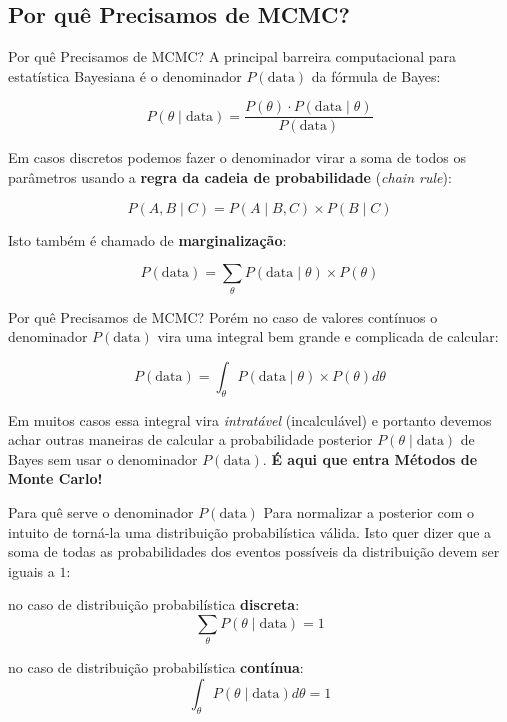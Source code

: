 \subsection{Por quê Precisamos de MCMC?}
\begin{frame}{Por quê Precisamos de MCMC?}
  A principal barreira computacional para estatística Bayesiana é o denominador
  $P(\text{data})$ da fórmula de Bayes:

  $$P(\theta \mid \text{data})=\frac{P(\theta) \cdot P(\text{data} \mid \theta)}{P(\text{data})}$$

  Em casos discretos podemos fazer o denominador virar a soma de todos os parâmetros
  usando a \textbf{regra da cadeia de probabilidade} (\textit{chain rule}):

  $$P(A,B \mid C)=P(A \mid B,C) \times P(B \mid C)$$

  Isto também é chamado de \textbf{marginalização}:

  $$P(\text{data})=\sum_{\theta} P(\text{data} \mid \theta) \times P(\theta)$$
\end{frame}

\begin{frame}{Por quê Precisamos de MCMC?}
  Porém no caso de valores contínuos o denominador $P(\text{data})$ vira uma integral
  bem grande e complicada de calcular:

  $$P(\text{data})=\int_{\theta} P(\text{data} \mid \theta) \times P(\theta)d \theta$$

  Em muitos casos essa integral vira \textit{intratável} (incalculável) e
  portanto devemos achar outras maneiras de calcular a probabilidade posterior
  $P(\theta \mid \text{data})$ de Bayes sem usar o denominador $P(\text{data})$.
  \vfill
  \Large \textbf{É aqui que entra Métodos de Monte Carlo!}
\end{frame}

\begin{frame}{Para quê serve o denominador $P(\text{data})$}
  Para normalizar a posterior com o intuito de torná-la uma distribuição
  probabilística válida. Isto quer dizer que a soma de todas as probabilidades
  dos eventos possíveis da distribuição devem ser iguais a $1$:
  \begin{vfilleditems}
    \item no caso de distribuição probabilística \textbf{discreta}:
    $$\sum_{\theta} P(\theta \mid \text{data}) = 1$$
    \item no caso de distribuição probabilística \textbf{contínua}:
    $$\int_{\theta} P(\theta \mid \text{data})d \theta = 1$$
  \end{vfilleditems}
\end{frame}

